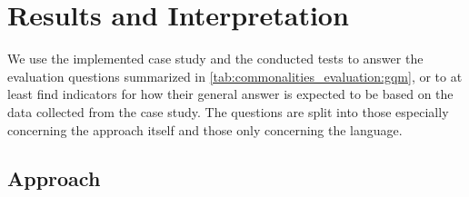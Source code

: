 


\section{Results and Interpretation}

We use the implemented case study and the conducted tests to answer the evaluation questions summarized in \autoref{tab:commonalities_evaluation:gqm}, or to at least find indicators for how their general answer is expected to be based on the data collected from the case study.
The questions are split into those especially concerning the \commonalities approach itself and those only concerning the \commonalities language.

\subsection*{\Commonalities Approach}

